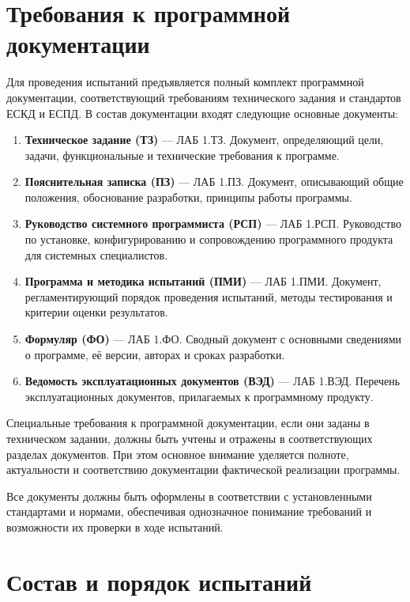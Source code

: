 \newpage
\section{Требования к программной документации}

Для проведения испытаний предъявляется полный комплект программной документации, соответствующий требованиям технического задания и стандартов ЕСКД и ЕСПД. В состав документации входят следующие основные документы:

\begin{enumerate}
    \item \textbf{Техническое задание (ТЗ)} — ЛАБ 1.ТЗ. Документ, определяющий цели, задачи, функциональные и технические требования к программе.
    \item \textbf{Пояснительная записка (ПЗ)} — ЛАБ 1.ПЗ. Документ, описывающий общие положения, обоснование разработки, принципы работы программы.
    \item \textbf{Руководство системного программиста (РСП)} — ЛАБ 1.РСП. Руководство по установке, конфигурированию и сопровождению программного продукта для системных специалистов.
    \item \textbf{Программа и методика испытаний (ПМИ)} — ЛАБ 1.ПМИ. Документ, регламентирующий порядок проведения испытаний, методы тестирования и критерии оценки результатов.
    \item \textbf{Формуляр (ФО)} — ЛАБ 1.ФО. Сводный документ с основными сведениями о программе, её версии, авторах и сроках разработки.
    \item \textbf{Ведомость эксплуатационных документов (ВЭД)} — ЛАБ 1.ВЭД. Перечень эксплуатационных документов, прилагаемых к программному продукту.
\end{enumerate}

Специальные требования к программной документации, если они заданы в техническом задании, должны быть учтены и отражены в соответствующих разделах документов. При этом основное внимание уделяется полноте, актуальности и соответствию документации фактической реализации программы.

Все документы должны быть оформлены в соответствии с установленными стандартами и нормами, обеспечивая однозначное понимание требований и возможности их проверки в ходе испытаний.

\newpage
\section{Состав и порядок испытаний}

